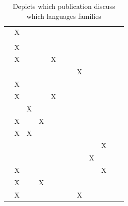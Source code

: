 \documentclass[11pt,a4paper]{book}
\theoremstyle{definition}
\theoremstyle{definition}
\theoremstyle{definition}
\theoremstyle{remark}
\begin{document}
\begin{table}
\begin{tabular}{lp{1cm}p{1cm}p{1cm}p{1cm}p{1cm}p{1cm}p{1.1cm}p{1cm}p{1cm}p{1cm}p{1cm}}
 \cite{aleksandrowicz2017computational}  	& X	& 	& 	& 	& 	& 	& 	& 	& 	& 	\\
 \cite{fenton2017proposed}  	& 	& 	& 	& 	& 	& 	& 	& 	& 	& 	\\
 \cite{lagnado2017causation}  	& X	& 	& 	& 	& 	& 	& 	& 	& 	& 	\\
 \cite{bochman2018actual}  	& X	& 	& 	& X	& 	& 	& 	& 	& 	& 	\\
 \cite{ibeling2018conditional}  	& 	& 	& 	& 	& 	& 	& X	& 	& 	& 	\\
 \cite{beckers2018principled} 	& X	& 	& 	& 	& 	& 	& 	& 	& 	& 	\\
 \cite{bochman2018laws}  	& X	& 	& 	& X	& 	& 	& 	& 	& 	& 	\\
 \cite{denecker2018causal}  	& 	& X	& 	& 	& 	& 	& 	& 	& 	& 	\\
 \cite{batusov2018situation}  	& X	& 	& X	& 	& 	& 	& 	& 	& 	& 	\\
 \cite{denecker2019explaining}  	& X	& X	& 	& 	& 	& 	& 	& 	& 	& 	\\
 \cite{liepicna2019evaluation}  	& 	& 	& 	& 	& 	& 	& 	& 	& X	& 	\\
 \cite{leblanc2019explaining} 	& 	& 	& 	& 	& 	& 	& 	& X	& 	& 	\\
 \cite{liepicna2020arguing} 	& X	& 	& 	& 	& 	& 	& 	& 	& X	& 	\\
 \cite{khannecessary}  	& X	& 	& X	& 	& 	& 	& 	& 	& 	& 	\\
 \cite{ibeling2020probabilistic}  	& X	& 	& 	& 	& 	& 	& X	& 	& 	& 	\\
\bottomrule
\end{tabular}
\caption{Depicts which publication discuss which languages families}
\label{tab:language}
\end{table}


 
\end{document}
